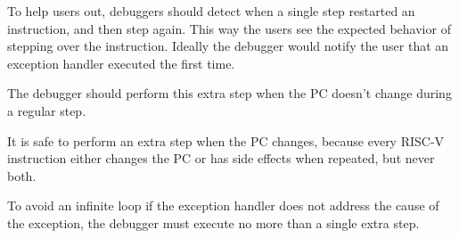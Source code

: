 To help users out, debuggers should detect when a single step restarted an
instruction, and then step again. This way the users see the expected behavior
of stepping over the instruction. Ideally the debugger would notify the user
that an exception handler executed the first time.

The debugger should perform this extra step when the PC doesn't change during a
regular step.

\begin{commentary}
    It is safe to perform an extra step when the PC changes, because every
    RISC-V instruction either changes the PC or has side effects when repeated,
    but never both.
\end{commentary}

To avoid an infinite loop if the exception handler does not address the cause of
the exception, the debugger must execute no more than a single extra step.
